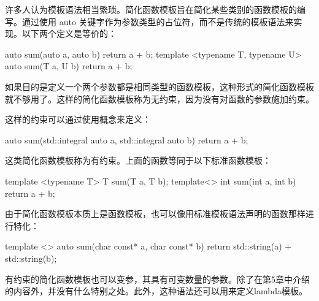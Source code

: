 
许多人认为模板语法相当繁琐。简化函数模板旨在简化某些类别的函数模板的编写。通过使用 auto 关键字作为参数类型的占位符，而不是传统的模板语法来实现。以下两个定义是等价的：

\begin{cpp}
auto sum(auto a, auto b)
{
    return a + b;
}
template <typename T, typename U>
auto sum(T a, U b)
{
    return a + b;
}
\end{cpp}

如果目的是定义一个两个参数都是相同类型的函数模板，这种形式的简化函数模板就不够用了。这样的简化函数模板称为无约束，因为没有对函数的参数施加约束。

这样的约束可以通过使用概念来定义：

\begin{cpp}
auto sum(std::integral auto a, std::integral auto b)
{
    return a + b;
}
\end{cpp}

这类简化函数模板称为有约束。上面的函数等同于以下标准函数模板：

\begin{cpp}
template <typename T>
T sum(T a, T b);
template<>
int sum(int a, int b)
{
    return a + b;
}
\end{cpp}

由于简化函数模板本质上是函数模板，也可以像用标准模板语法声明的函数那样进行特化：

\begin{cpp}
template <>
auto sum(char const* a, char const* b)
{
    return std::string(a) + std::string(b);
}
\end{cpp}

有约束的简化函数模板也可以变参，其具有可变数量的参数。除了在第5章中介绍的内容外，并没有什么特别之处。此外，这种语法还可以用来定义lambda模板。



